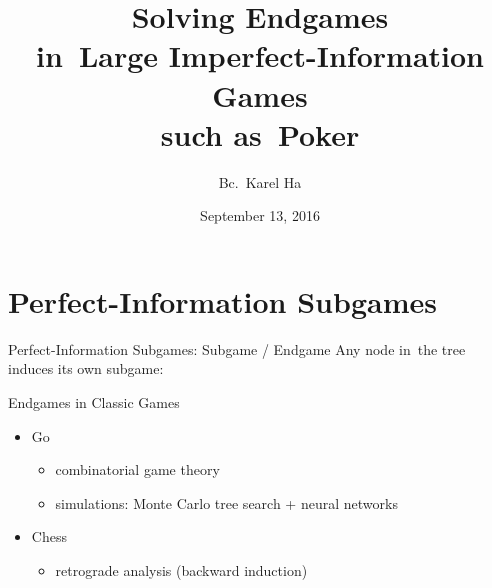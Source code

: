\documentclass{beamer}
\title{Solving Endgames \\in~Large Imperfect-Information Games \\such as~Poker}
\date{September 13, 2016}
\author{Bc.~Karel Ha}
\institute{Department of~Applied Mathematics \\Charles University}
\theoremstyle{definition}
\begin{document}
  {
    \maketitle
  }

  \section{Perfect-Information Subgames}

  \begin{frame}{Perfect-Information Subgames: Subgame / Endgame}
    Any node in~the tree induces its own subgame:
    \pause
    \begin{figure}[H]
      \raggedleft
      \scriptsize
      \def\svgwidth{.8\textwidth}
      
    \end{figure}
  \end{frame}

  \begin{frame}{Endgames in Classic Games}
    \pause
    \begin{itemize}[<+- | alert@+>]
      \item Go
        \begin{itemize}
          \item combinatorial game theory
          \item simulations: Monte Carlo tree search + neural networks
        \end{itemize}
      \item Chess
        \begin{itemize}
          \item retrograde analysis (backward induction)
        \end{itemize}
    \end{itemize}
  \end{frame}
\end{document}
